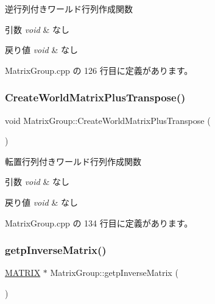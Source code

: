 逆行列付きワールド行列作成関数 


\begin{DoxyParams}{引数}
{\em void} & なし \\
\hline
\end{DoxyParams}

\begin{DoxyRetVals}{戻り値}
{\em void} & なし \\
\hline
\end{DoxyRetVals}


 Matrix\+Group.\+cpp の 126 行目に定義があります。

\mbox{\label{class_matrix_group_a24045c3c4a4aa8eff02e0aa926e5e2d3}} 
\subsubsection{\texorpdfstring{Create\+World\+Matrix\+Plus\+Transpose()}{CreateWorldMatrixPlusTranspose()}}
{\footnotesize\ttfamily void Matrix\+Group\+::\+Create\+World\+Matrix\+Plus\+Transpose (\begin{DoxyParamCaption}{ }\end{DoxyParamCaption})}



転置行列付きワールド行列作成関数 


\begin{DoxyParams}{引数}
{\em void} & なし \\
\hline
\end{DoxyParams}

\begin{DoxyRetVals}{戻り値}
{\em void} & なし \\
\hline
\end{DoxyRetVals}


 Matrix\+Group.\+cpp の 134 行目に定義があります。

\mbox{\label{class_matrix_group_a4227a527795409f939c78d58de5526f8}} 
\subsubsection{\texorpdfstring{getp\+Inverse\+Matrix()}{getpInverseMatrix()}}
{\footnotesize\ttfamily \mbox{\hyperlink{_matrix_8h_a032295cd9fb1b711757c90667278e744}{M\+A\+T\+R\+IX}} $\ast$ Matrix\+Group\+::getp\+Inverse\+Matrix (\begin{DoxyParamCaption}{ }\end{DoxyParamCaption})}



